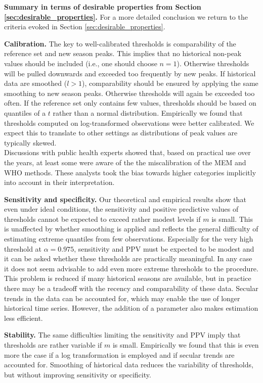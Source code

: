 \documentclass[12pt]{article}
\begin{document}
\noindent \textbf{Summary in terms of desirable properties from Section \ref{sec:desirable_properties}.} For a more detailed conclusion we return to the criteria evoked in Section \ref{sec:desirable_properties}.

\begin{description}
\item \textbf{Calibration.} The key to well-calibrated thresholds is comparability of the reference set and new season peaks. This implies that no historical non-peak values should be included (i.e., one should choose $n = 1$). Otherwise thresholds will be pulled downwards and exceeded too frequently by new peaks. If historical data are smoothed ($l > 1$), comparability should be ensured by applying the same smoothing to new season peaks. Otherwise thresholds will again be exceeded too often. If the reference set only contains few values, thresholds should be based on quantiles of a $t$ rather than a normal distribution. Empirically we found that thresholds computed on log-transformed observations were better calibrated. We expect this to translate to other settings as distributions of peak values are typically skewed.\\
Discussions with public health experts showed that, based on practical use over the years, at least some were aware of the the miscalibration of the MEM and WHO methods. These analysts took the bias towards higher categories implicitly into account in their interpretation.
\item \textbf{Sensitivity and specificity.} Our theoretical and empirical results show that even under ideal conditions, the sensitivity and positive predictive values of thresholds cannot be expected to exceed rather modest levels if $m$ is small. This is unaffected by whether smoothing is applied and reflects the general difficulty of estimating extreme quantiles from few observations. Especially for the very high threshold at $\alpha = 0.975$, sensitivity and PPV must be expected to be modest and it can be asked whether these thresholds are practically meaningful. In any case it does not seem advisable to add even more extreme thresholds to the procedure. This problem is reduced if many historical seasons are available, but in practice there may be a tradeoff with the recency and comparability of these data. Secular trends in the data can be accounted for, which may enable the use of longer historical time series. However, the addition of a parameter also makes estimation less efficient.
\item \textbf{Stability.} The same difficulties limiting the sensitivity and PPV imply that thresholds are rather variable if $m$ is small. Empirically we found that this is even more the case if a log transformation is employed and if secular trends are accounted for. Smoothing of historical data reduces the variability of thresholds, but without improving sensitivity or specificity.

\end{description}
\end{document}

